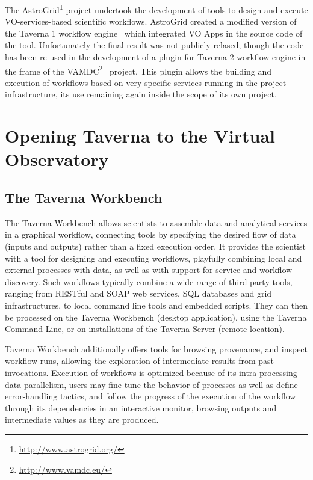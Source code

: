 \documentclass[final,authoryear,5p,times,twocolumn]{elsarticle}
\newcommand{\urlsamefont}[1]{\urlstyle{same}\url{#1}}
\newcommand{\hrefnote}[2]{\href{#1}{#2}\footnote{\urlsamefont{#1}}}
\begin{document}
The \hrefnote{http://www.astrogrid.org/}{AstroGrid} project undertook the development of tools to design and execute VO-services-based scientific workflows. AstroGrid created a modified version of the Taverna 1 workflow engine~\citep{Benson2009, Walton2010} which integrated VO Apps in the source code of the tool. Unfortunately the final result was not publicly relased, though the code has been re-used in the development of a plugin for Taverna 2 workflow engine in the frame of the \hrefnote{http://www.vamdc.eu/}{VAMDC}~\citep{Walton2011} project. This plugin allows the building and execution of workflows based on very specific services running in the project infrastructure, its use remaining again inside the scope of its own project. 

\section{Opening Taverna to the Virtual Observatory}
\label{Opening}

\subsection{The Taverna Workbench}
\label{TavernaWorkbench}

The Taverna Workbench allows scientists to assemble data and analytical services in a graphical workflow, connecting tools by specifying the desired flow of data (inputs and outputs) rather than a fixed execution order. It provides the scientist with a tool for designing and executing workflows, playfully combining local and external processes with data, as well as with support for service and workflow discovery. Such workflows typically combine a wide range of third-party tools, ranging from RESTful and SOAP web services, SQL databases and grid infrastructures, to local command line tools and embedded scripts. They can then be processed on the Taverna Workbench (desktop application), using the Taverna Command Line, or on installations of the Taverna Server (remote location).

Taverna Workbench additionally offers tools for browsing provenance, and inspect workflow runs, allowing the exploration of intermediate results from past invocations. Execution of workflows is optimized because of its intra-processing data parallelism, users may fine-tune the behavior of processes as well as define error-handling tactics, and follow the progress of the execution of the workflow through its dependencies in an interactive monitor, browsing outputs and intermediate values as they are produced.
\end{document}
